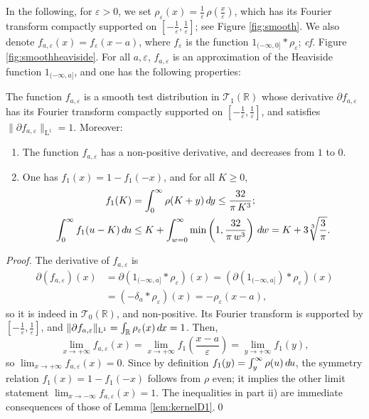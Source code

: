 \documentclass[envcountsame]{svmult}
\newcommand{\R}{\mathbb{R}}
\newcommand{\leb}{\mathrm{L}}
\newcommand{\testf}{\mathscr{T}}
\newcommand{\eps}{\varepsilon}
\newcommand{\DD}[1]{\,d\hspace*{-0.3mm}{#1}}
\begin{document}
In the following, for $\eps>0$, we set $\rho_{\eps}(x)=\frac{1}{\eps}\,\rho(\frac{x}{\eps})$, which has its Fourier transform compactly supported on $[-\frac{1}{\eps},\frac{1}{\eps}]$; see Figure \ref{fig:smooth}. We also denote $f_{a,\eps}(x)=f_\eps(x-a)$, where $f_\eps$ is the function $1_{(-\infty,0]} * \rho_\eps$; \emph{cf.} Figure \ref{fig:smoothheaviside}. 
For all $a,\eps$, $f_{a,\eps}$ is an approximation of the Heaviside function $1_{(-\infty,a]}$, and one has the following properties:
 \begin{proposition}
 The function $f_{a,\eps}$ is a smooth test distribution in $\testf_1(\R)$ whose derivative $\partial f_{a,\eps}$ has its Fourier transform compactly supported on $[-\frac{1}{\eps},\frac{1}{\eps}]$, and satisfies $\|\partial f_{a,\eps}\|_{\leb^1} = 1$. Moreover:
 \begin{enumerate}
 	\item The function $f_{a,\eps}$ has a non-positive derivative, and decreases from $1$ to $0$.
 	\item One has $f_1(x)=1-f_1(-x)$, and for all $K\geq 0$,
\begin{align*}
f_1(K)&=\int_{0}^\infty \rho(K+y)\DD{y} \leq \frac{32}{\pi\,K^3};\\
\int_0^\infty f_1(u-K)\DD{u} & \leq K + \int_{w=0}^\infty \min\left(1,\frac{32}{\pi\,w^3}\right)\DD{w} = K  + 3\sqrt[3]{\frac{3}{\pi}}.
\end{align*}
 \end{enumerate}
 \end{proposition}
 
\begin{proof}
The derivative of $f_{a,\eps}$ is
\begin{align*}
\partial(f_{a,\eps})(x) &= \partial(1_{(-\infty,a]}*\rho_\eps)(x) = \left(\partial(1_{(-\infty,a]}) * \rho_\eps\right)(x)  \\
&= \left(-\delta_a * \rho_\eps\right)(x) = -\rho_{\eps}(x-a),
\end{align*}
so it is indeed in $\testf_0(\R)$, and non-positive. Its Fourier transform is supported by $[-\frac{1}{\eps},\frac{1}{\eps}]$, and $\|\partial f_{a,\eps}\|_{\leb^1}=\int_{\R}\rho_{\eps}(x)\DD{x} = 1$. Then,
$$\lim_{x \to +\infty} f_{a,\eps}(x) = \lim_{x \to +\infty} f_{1}\!\left(\frac{x-a}{\eps}\right) = \lim_{y \to +\infty} f_1(y),$$
so $\lim_{x \to +\infty} f_{a,\eps}(x) = 0$.
Since by definition $f_1(y)=\int_y^\infty \rho(u) \DD{u}$,
the symmetry relation \hbox{$f_1(x)=1-f_1(-x)$} follows from $\rho$ even;
it implies the other limit statement $\lim_{x \to -\infty} f_{a,\eps}(x) = 1$.
The inequalities in part ii) are immediate consequences of those of Lemma \ref{lem:kernelD1}.\qed
\end{proof}
\end{document}
